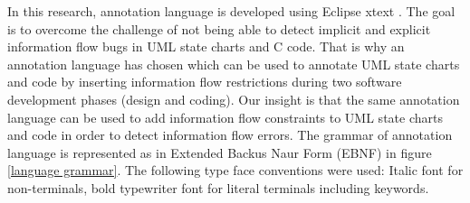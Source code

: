In this research, annotation language is developed using Eclipse xtext \cite{ref_17_xtext:grammar}. The goal is to overcome the challenge of not being able to detect implicit and explicit information flow bugs in UML state charts and C code. That is why an annotation language has chosen
which can be used to annotate UML state charts and code by inserting information flow
restrictions during two software development phases (design
and coding). Our insight is that the same annotation language
can be used to add information flow constraints to UML state
charts and code in order to detect information flow errors. The grammar of annotation language is represented as in Extended Backus Naur Form (EBNF) in figure \ref{language grammar}. The following type face conventions were used: Italic font for non-terminals, bold typewriter font for literal terminals including keywords.\\
 
